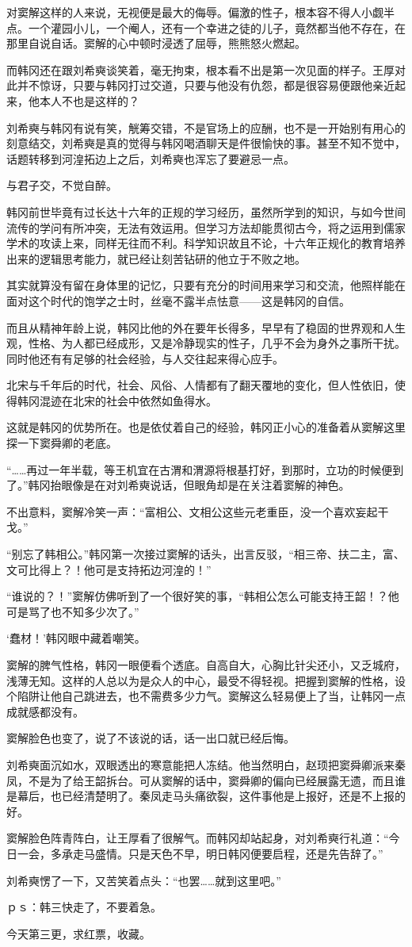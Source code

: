 对窦解这样的人来说，无视便是最大的侮辱。偏激的性子，根本容不得人小觑半点。一个灌园小儿，一个阉人，还有一个幸进之徒的儿子，竟然都当他不存在，在那里自说自话。窦解的心中顿时浸透了屈辱，熊熊怒火燃起。

而韩冈还在跟刘希奭谈笑着，毫无拘束，根本看不出是第一次见面的样子。王厚对此并不惊讶，只要与韩冈打过交道，只要与他没有仇怨，都是很容易便跟他亲近起来，他本人不也是这样的？

刘希奭与韩冈有说有笑，觥筹交错，不是官场上的应酬，也不是一开始别有用心的刻意结交，刘希奭是真的觉得与韩冈喝酒聊天是件很愉快的事。甚至不知不觉中，话题转移到河湟拓边上之后，刘希奭也浑忘了要避忌一点。

与君子交，不觉自醉。

韩冈前世毕竟有过长达十六年的正规的学习经历，虽然所学到的知识，与如今世间流传的学问有所冲突，无法有效运用。但学习方法却能贯彻古今，将之运用到儒家学术的攻读上来，同样无往而不利。科学知识故且不论，十六年正规化的教育培养出来的逻辑思考能力，就已经让刻苦钻研的他立于不败之地。

其实就算没有留在身体里的记忆，只要有充分的时间用来学习和交流，他照样能在面对这个时代的饱学之士时，丝毫不露半点怯意——这是韩冈的自信。

而且从精神年龄上说，韩冈比他的外在要年长得多，早早有了稳固的世界观和人生观，性格、为人都已经成形，又是冷静现实的性子，几乎不会为身外之事所干扰。同时他还有有足够的社会经验，与人交往起来得心应手。

北宋与千年后的时代，社会、风俗、人情都有了翻天覆地的变化，但人性依旧，使得韩冈混迹在北宋的社会中依然如鱼得水。

这就是韩冈的优势所在。也是依仗着自己的经验，韩冈正小心的准备着从窦解这里探一下窦舜卿的老底。

“……再过一年半载，等王机宜在古渭和渭源将根基打好，到那时，立功的时候便到了。”韩冈抬眼像是在对刘希奭说话，但眼角却是在关注着窦解的神色。

不出意料，窦解冷笑一声：“富相公、文相公这些元老重臣，没一个喜欢妄起干戈。”

“别忘了韩相公。”韩冈第一次接过窦解的话头，出言反驳，“相三帝、扶二主，富、文可比得上？！他可是支持拓边河湟的！”

“谁说的？！”窦解仿佛听到了一个很好笑的事，“韩相公怎么可能支持王韶！？他可是骂了也不知多少次了。”

‘蠢材！’韩冈眼中藏着嘲笑。

窦解的脾气性格，韩冈一眼便看个透底。自高自大，心胸比针尖还小，又乏城府，浅薄无知。这样的人总以为是众人的中心，最受不得轻视。把握到窦解的性格，设个陷阱让他自己跳进去，也不需费多少力气。窦解这么轻易便上了当，让韩冈一点成就感都没有。

窦解脸色也变了，说了不该说的话，话一出口就已经后悔。

刘希奭面沉如水，双眼透出的寒意能把人冻结。他当然明白，赵顼把窦舜卿派来秦凤，不是为了给王韶拆台。可从窦解的话中，窦舜卿的偏向已经展露无遗，而且谁是幕后，也已经清楚明了。秦凤走马头痛欲裂，这件事他是上报好，还是不上报的好。

窦解脸色阵青阵白，让王厚看了很解气。而韩冈却站起身，对刘希奭行礼道：“今日一会，多承走马盛情。只是天色不早，明日韩冈便要启程，还是先告辞了。”

刘希奭愣了一下，又苦笑着点头：“也罢……就到这里吧。”

ｐｓ：韩三快走了，不要着急。

今天第三更，求红票，收藏。

